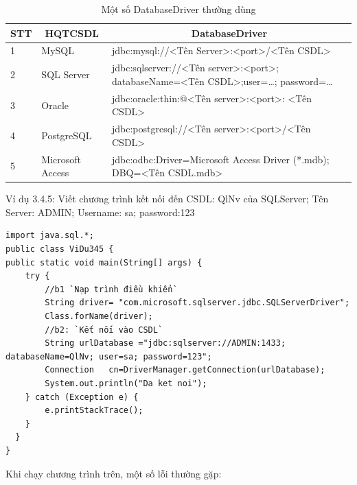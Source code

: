 \begin{center}
	\begin{longtable}{|m{1cm}|m{2cm}|m{8cm}|}
		\caption[Một số DatabaseURL thường dùng]{Một số DatabaseDriver thường dùng}
		\label{bang33}
		\endfirsthead
		\endhead
		\hline
		\multicolumn{1}{|c|}{\textbf{STT}} &\multicolumn{1}{c|}{	\textbf{ HQTCSDL}}
		&\multicolumn{1}{c|}{	\textbf{DatabaseDriver}}\\ \hline
		1&	MySQL & jdbc:mysql://<Tên Server>:<port>/<Tên CSDL>\\ \hline
		2&SQL Server &	jdbc:sqlserver://<Tên server>:<port>; databaseName=<Tên CSDL>;user=…; password=… 
		 \\ \hline
		3&	Oracle & jdbc:oracle:thin:@<Tên server>:<port>: <Tên CSDL>
		\\ \hline 
		4&	PostgreSQL &jdbc:postgresql://<Tên server>:<port>/<Tên CSDL>\\ \hline 
		5&	Microsoft Access
		&	jdbc:odbc:Driver={Microsoft Access Driver (*.mdb)};
		DBQ=<Tên CSDL.mdb>
		\\ \hline 
	\end{longtable}
\end{center}
\vspace{-1cm}
Ví dụ 3.4.5: Viết chương trình kết nối đến CSDL: QlNv của SQLServer; Tên Server: ADMIN; Username: sa; password:123
 \begin{lstlisting}[escapechar=`]
import java.sql.*;
public class ViDu345 {
public static void main(String[] args) {
	try {
		//b1 `Nạp trình điều khiển`
		String driver= "com.microsoft.sqlserver.jdbc.SQLServerDriver";
		Class.forName(driver);
		//b2: `Kết nối vào CSDL`
		String urlDatabase ="jdbc:sqlserver://ADMIN:1433; databaseName=QlNv; user=sa; password=123";
		Connection   cn=DriverManager.getConnection(urlDatabase);
		System.out.println("Da ket noi");
	} catch (Exception e) {
		e.printStackTrace();
	}
  }
}
 \end{lstlisting}
 Khi chạy chương trình trên, một số lỗi thường gặp:
 
